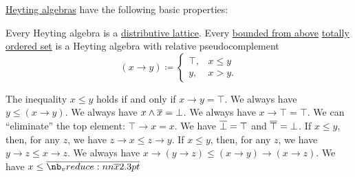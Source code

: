 \begin{proposition}\label{thm:def:heyting_algebra}
  \hyperref[def:heyting_algebra]{Heyting algebras} have the following basic properties:
  \begin{thmenum}
     Every Heyting algebra is a \hyperref[def:distributive_lattice]{distributive lattice}.
     Every \hyperref[def:extremal_points/bounds]{bounded from above} \hyperref[def:totally_ordered_set]{totally ordered set} is a Heyting algebra with relative pseudocomplement
    \begin{equation}\label{eq:thm:def:heyting_algebra/totally}
      (x \rightarrow y) \coloneqq \begin{cases}
        \top, &x \leq y \\
        y,    &x > y.
      \end{cases}
    \end{equation}

     The inequality \( x \leq y \) holds if and only if \( x \rightarrow y = \top \).
     We always have \( y \leq (x \rightarrow y) \).
     We always have \( x \wedge \oline{x} = \bot \).
     We always have \( x \rightarrow \top = \top \).
     We can \enquote{eliminate} the top element: \( \top \rightarrow x = x \).
     We have \( \oline{\bot} = \top \) and \( \oline{\top} = \bot \).
     If \( x \leq y \), then, for any \( z \), we have \( z \rightarrow x \leq z \rightarrow y \).
     If \( x \leq y \), then, for any \( z \), we have \( y \rightarrow z \leq x \rightarrow z \).
     We always have \( x \rightarrow (y \rightarrow z) \leq (x \rightarrow y) \rightarrow (x \rightarrow z) \).
     We have \( x \leq \doline{x} \)
  \end{thmenum}
\end{proposition}
